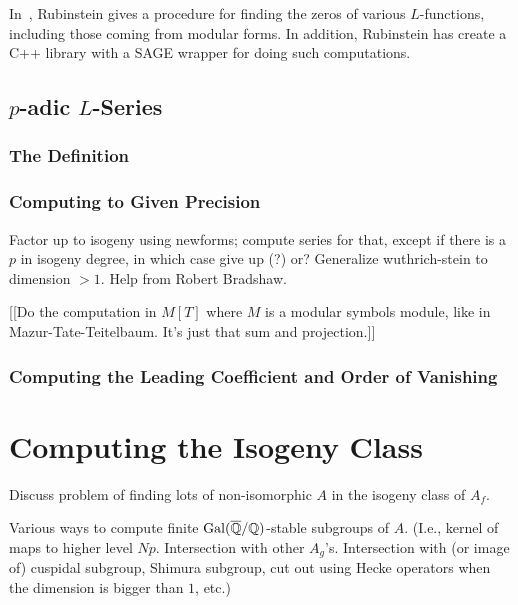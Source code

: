 \documentclass{article}
\begin{document}
In~\cite{rubinstein:zeros:1998}, Rubinstein gives a procedure for finding the zeros of
various $L$-functions, including those coming from modular forms. In addition,
Rubinstein has create a C++ library with a SAGE wrapper for doing such
computations.

\subsection{$p$-adic $L$-Series}


\subsubsection{The Definition}

\subsubsection{Computing to Given Precision}
Factor up to isogeny using newforms; compute series for that,
except if there is a $p$ in isogeny degree, in which case give up (?) or?
Generalize wuthrich-stein to dimension $>1$.  Help from Robert Bradshaw.

[[Do the computation in $M[T]$ where $M$ is a modular symbols module, like
in Mazur-Tate-Teitelbaum.  It's just that sum and projection.]]

\subsubsection{Computing the Leading Coefficient and Order of Vanishing}


\section{Computing the Isogeny Class}

Discuss problem of finding lots of non-isomorphic $A$ in the isogeny
class of $A_f$.

Various ways to compute finite $\operatorname{Gal}(\overline{\mathbb{Q}}/\mathbb{Q})$-stable subgroups of
$A$.  (I.e., kernel of maps to higher level $Np$.  Intersection with
other $A_g$'s.  Intersection with (or image of) cuspidal subgroup,
Shimura subgroup, cut out using Hecke operators when the dimension is
bigger than $1$, etc.)
\end{document}
